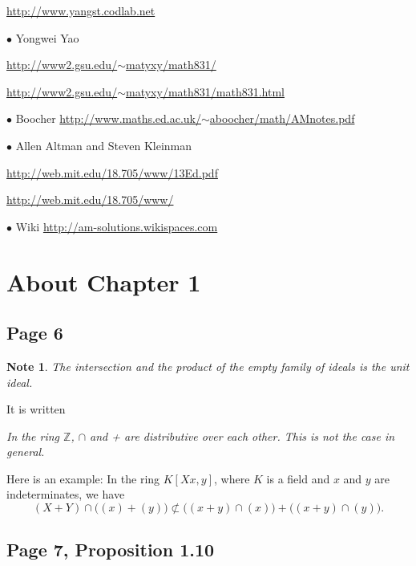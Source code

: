 \documentclass[parskip=half,fontsize=12pt]{scrartcl}%
\newcommand{\bu}{\bullet}
\newtheorem{note}[thm]{Note}
\begin{document}
\href{http://www.yangst.codlab.net}{http://www.yangst.codlab.net}

$\bu$ Yongwei Yao

\href{http://www2.gsu.edu/~matyxy/math831/}{http://www2.gsu.edu/$\sim$matyxy/math831/}

\href{http://www2.gsu.edu/~matyxy/math831/math831.html}{http://www2.gsu.edu/$\sim$matyxy/math831/math831.html}


$\bu$ Boocher \href{http://www.maths.ed.ac.uk/~aboocher/math/AMnotes.pdf}{\small http://www.maths.ed.ac.uk/$\sim$aboocher/math/AMnotes.pdf}

$\bu$ Allen Altman and Steven Kleinman %

\href{http://web.mit.edu/18.705/www/13Ed.pdf}{http://web.mit.edu/18.705/www/13Ed.pdf}

\href{http://web.mit.edu/18.705/www/}{http://web.mit.edu/18.705/www/}

$\bu$ Wiki \href{http://am-solutions.wikispaces.com}{http://am-solutions.wikispaces.com}

\section{About Chapter 1}

\subsection{Page 6}%

\begin{note}\label{ef}
The intersection and the product of the empty family of ideals is the unit ideal.
\end{note}

It is written

\emph{In the ring $\mathbb Z$, $\cap$ and + are distributive over each other. This is not the case in general.}

Here is an example: In the ring $K[Xx,y]$, where $K$ is a field and $x$ and $y$ are indeterminates, we have 
$$
(X+Y)\cap\Big((x)+(y)\Big)\not\subset\Big((x+y)\cap (x)\Big)+\Big((x+y)\cap (y)\Big).
$$

\subsection{Page 7, Proposition 1.10}%
\end{document}

